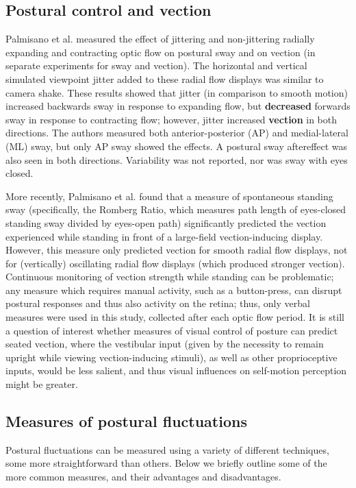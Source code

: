 \documentclass[11pt]{article}
\begin{document}
\begin{linenumbers}
\subsection*{Postural control and vection}
Palmisano et al. \cite{Palmisano:2009uc} measured the effect of jittering and non-jittering radially expanding and contracting optic flow on postural sway and on vection (in separate experiments for sway and vection). The horizontal and vertical simulated viewpoint jitter added to these radial flow displays was similar to camera shake. These results showed that jitter (in comparison to smooth motion) increased backwards sway in response to expanding flow, but \textbf{decreased} forwards sway in response to contracting flow; however, jitter increased \textbf{vection} in both directions. The authors measured both anterior-posterior (AP) and medial-lateral (ML) sway, but only AP sway showed the effects. A postural sway aftereffect was also seen in both directions. Variability was not reported, nor was sway with eyes closed. %

More recently, Palmisano et al. \cite{Palmisano:2014ez} found that a measure of spontaneous standing sway (specifically, the Romberg Ratio, which measures path length of eyes-closed standing sway divided by eyes-open path) significantly predicted the vection experienced while standing in front of a large-field vection-inducing display. However, this measure only predicted vection for smooth radial flow displays, not for (vertically) oscillating radial flow displays (which produced stronger vection). Continuous monitoring of vection strength while standing can be problematic; any measure which requires manual activity, such as a button-press, can disrupt postural responses and thus also activity on the retina; thus, only verbal measures were used in this study, collected after each optic flow period. It is still a question of interest whether measures of visual control of posture can predict seated vection, where the vestibular input (given by the necessity to remain upright while viewing vection-inducing stimuli), as well as other proprioceptive inputs, would be less salient, and thus visual influences on self-motion perception might be greater. 


\subsection*{Measures of postural fluctuations}

Postural fluctuations can be measured using a variety of different techniques, some more straightforward than others. Below we briefly outline some of the more common measures, and their advantages and disadvantages. 


\end{linenumbers}
\end{document}
